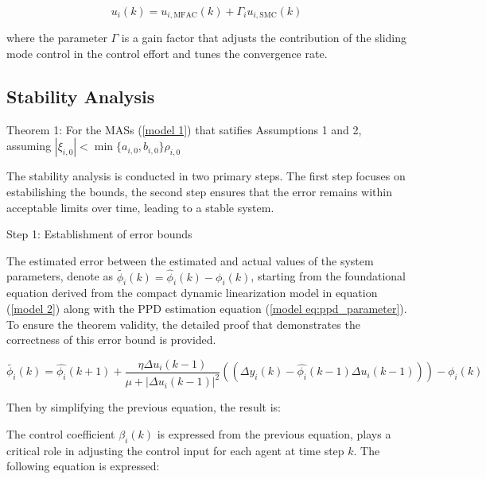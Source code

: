 \documentclass[journal,onecolumn]{IEEEtran}
\begin{document}
\begin{equation}
    \label{model eq:mfasmc}
    u_i(k) = u_{i,\text{MFAC}}(k) + \Gamma_i  u_{i,\text{SMC}}(k)
\end{equation}

where the parameter \(\Gamma\) is a gain factor that adjusts the contribution of the sliding mode control in the control effort and tunes the convergence rate.

\subsection{Stability Analysis}

Theorem 1: For the MASs (\ref{model 1}) that satifies Assumptions 1 and 2, assuming $ |\xi_{i,0}| < \min\{a_{i,0}, b_{i,0}\} \rho_{i,0} $

The stability analysis is conducted in two primary steps. The first step focuses on estabilishing the bounds, the second step ensures that the error remains within acceptable limits over time, leading to a stable system.

Step 1: Establishment of error bounds

The estimated error between the estimated and actual values of the system parameters, denote as \(\tilde{\phi_i}(k)
=\hat{\phi}_i(k)-\phi_i(k) \), starting from the foundational equation derived from the compact dynamic linearization model in equation (\ref{model 2}) along with the PPD estimation equation (\ref{model eq:ppd_parameter}). To ensure the theorem validity, the detailed proof that demonstrates the correctness of this error bound is provided.

\begin{equation}
    \label{model 15}
    \tilde{\phi_i}(k) = \hat{\phi_i}(k+1) + \frac{\eta \Delta u_i(k-1)}{\mu + | \Delta u_i(k-1)|^2}  ((\Delta y_i(k) - \hat{\phi_i}(k-1)\Delta u_i(k-1) )) - \phi_i(k)
\end{equation}

Then by simplifying the previous equation, the result is:



The control coefficient \(\beta_i(k)\) is expressed from the previous equation, plays a critical role in adjusting the control input for each agent at time step $k$. The following equation is expressed:
\end{document}
